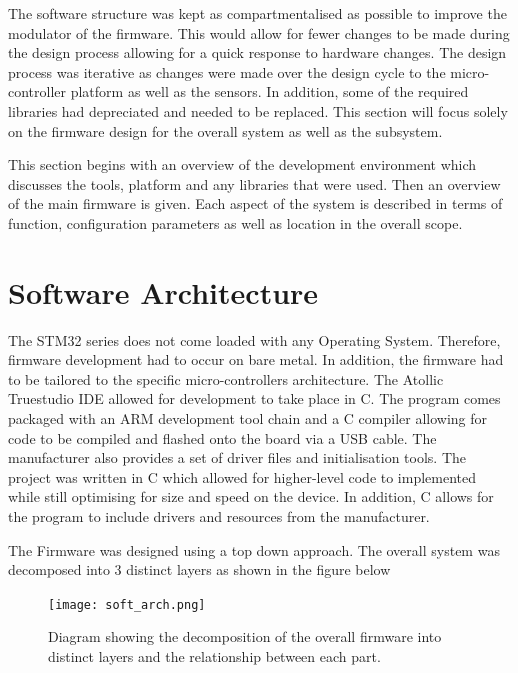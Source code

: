The software structure was kept as compartmentalised as possible to improve the modulator of the firmware. This would allow for fewer changes to be made during the design process allowing for a quick response to hardware changes. The design process was iterative as changes were made over the design cycle to the micro-controller platform as well as the sensors. In addition, some of the required libraries had depreciated and needed to be replaced.  This section will focus solely on the firmware design for the overall system as well as the subsystem. 

This section begins with an overview of the development environment which discusses the tools, platform and any libraries that were used. Then an overview of the main firmware is given. Each aspect of the system is described in terms of function, configuration parameters as well as location in the overall scope.

\section{Software Architecture}

The STM32 series does not come loaded with any Operating System. Therefore, firmware development had to occur on bare metal. In addition, the firmware had to be tailored to the specific micro-controllers architecture. The Atollic Truestudio IDE allowed for development to take place in C. The program comes packaged with an ARM development tool chain and a C compiler allowing for code to be compiled and flashed onto the board via a USB cable. The manufacturer also provides a set of driver files and  initialisation tools. The project was written in C which allowed for higher-level code to implemented while still optimising for size and speed on the device. In addition, C allows for the program to include drivers and resources from the manufacturer. \par 

The Firmware was designed using a top down approach. The overall system was decomposed into 3 distinct layers as shown in the figure below

\begin{figure}[H]
    \centering
    \texttt{[image: soft\_arch.png]}
    \caption{Diagram showing the decomposition of the overall firmware into distinct layers and the relationship between each part.}
    \label{fig:soft_arch}
\end{figure}

